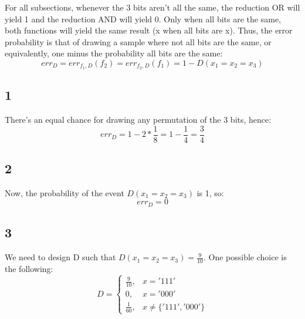 For all subsections, whenever the 3 bits aren't all the same, the reduction OR will yield 1 and the reduction AND will yield 0. 
Only when all bits are the same, both functions will yield the same result (x when all bits are x).
Thus, the error probability is that of drawing a sample where not all bits are the same, or equivalently, one minus the probability all bits are the same:
\begin{equation*}
    err_D = err_{f_1, D}(f_2) = err_{f_2, D}(f_1) = 1 - D(x_1=x_2=x_3)
\end{equation*}

\subsection*{1}
There's an equal chance for drawing any permutation of the 3 bits, hence:
\begin{equation*}
    err_D = 1 - 2*\frac{1}{8} = 1 - \frac{1}{4} = \frac{3}{4}
\end{equation*}

\subsection*{2}
Now, the probability of the event $D(x_1=x_2=x_3)$ is 1, so:
\begin{equation*}
    err_D = 0
\end{equation*}

\subsection*{3}
We need to design D such that $D(x_1=x_2=x_3) = \frac{9}{10}$. One possible choice is the following:
\begin{equation*}
    D = 
    \begin{cases}
        \frac{9}{10}, & x = '111' \\
        0, & x = '000' \\
        \frac{1}{60}, & x \neq \{'111', '000'\}
    \end{cases}
\end{equation*}